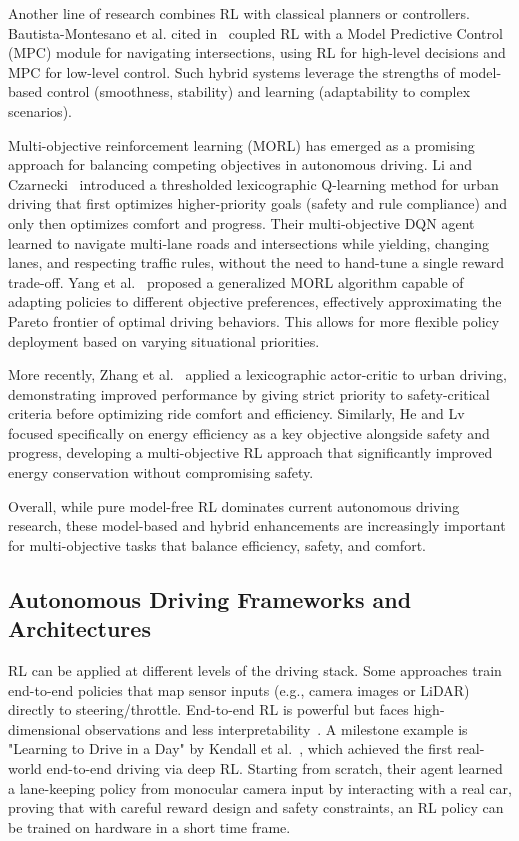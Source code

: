 \documentclass[12pt,a4paper]{article}
\begin{document}
Another line of research combines RL with classical planners or controllers. Bautista-Montesano et al. cited in~\cite{survey2023} coupled RL with a Model Predictive Control (MPC) module for navigating intersections, using RL for high-level decisions and MPC for low-level control. Such hybrid systems leverage the strengths of model-based control (smoothness, stability) and learning (adaptability to complex scenarios).

Multi-objective reinforcement learning (MORL) has emerged as a promising approach for balancing competing objectives in autonomous driving. Li and Czarnecki~\cite{li2019} introduced a thresholded lexicographic Q-learning method for urban driving that first optimizes higher-priority goals (safety and rule compliance) and only then optimizes comfort and progress. Their multi-objective DQN agent learned to navigate multi-lane roads and intersections while yielding, changing lanes, and respecting traffic rules, without the need to hand-tune a single reward trade-off. Yang et al.~\cite{yang2019} proposed a generalized MORL algorithm capable of adapting policies to different objective preferences, effectively approximating the Pareto frontier of optimal driving behaviors. This allows for more flexible policy deployment based on varying situational priorities.

More recently, Zhang et al.~\cite{zhang2023} applied a lexicographic actor-critic to urban driving, demonstrating improved performance by giving strict priority to safety-critical criteria before optimizing ride comfort and efficiency. Similarly, He and Lv~\cite{he2023} focused specifically on energy efficiency as a key objective alongside safety and progress, developing a multi-objective RL approach that significantly improved energy conservation without compromising safety.

Overall, while pure model-free RL dominates current autonomous driving research, these model-based and hybrid enhancements are increasingly important for multi-objective tasks that balance efficiency, safety, and comfort.

\subsection{Autonomous Driving Frameworks and Architectures}
RL can be applied at different levels of the driving stack. Some approaches train end-to-end policies that map sensor inputs (e.g., camera images or LiDAR) directly to steering/throttle. End-to-end RL is powerful but faces high-dimensional observations and less interpretability~\cite{survey2023}. A milestone example is "Learning to Drive in a Day" by Kendall et al.~\cite{kendall2019}, which achieved the first real-world end-to-end driving via deep RL. Starting from scratch, their agent learned a lane-keeping policy from monocular camera input by interacting with a real car, proving that with careful reward design and safety constraints, an RL policy can be trained on hardware in a short time frame.
\end{document}
